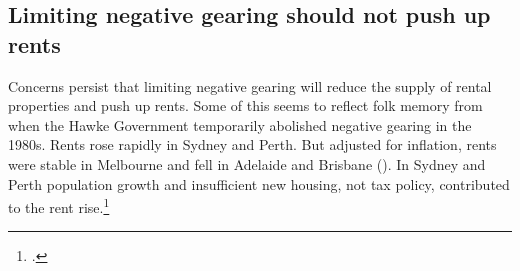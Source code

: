 \documentclass{grattan}\usepackage[]{graphicx}\usepackage[]{color}
\makeatletter
\newenvironment{kframe}{%
 \def\at@end@of@kframe{}%
 \ifinner\ifhmode%
  \def\at@end@of@kframe{\end{minipage}}%
  \begin{minipage}{\columnwidth}%
 \fi\fi%
 \def\FrameCommand##1{\hskip\@totalleftmargin \hskip-\fboxsep
 \colorbox{shadecolor}{##1}\hskip-\fboxsep
     \hskip-\linewidth \hskip-\@totalleftmargin \hskip\columnwidth}%
 \MakeFramed {\advance\hsize-\width
   \@totalleftmargin\z@ \linewidth\hsize
   \@setminipage}}%
 {\par\unskip\endMakeFramed%
 \at@end@of@kframe}
\newenvironment{knitrout}{}{} %
\newcommand\gao{Grattan analysis of}
\makeatother
\begin{document}
\begin{knitrout}
\color{fgcolor}\begin{kframe}


{\ttfamily\noindent\bfseries\color{errorcolor}{\#\# Error in rbind(benefits\_by\_taxable\_income\_before\_deductions, benefits\_by\_taxable\_income): object 'benefits\_by\_taxable\_income\_before\_deductions' not found}}\end{kframe}
\end{knitrout}
% 

\subsection{Limiting negative gearing should not push up rents}
Concerns persist that limiting negative gearing will reduce the supply of rental properties and push up rents. Some of this seems to reflect folk memory from when the Hawke Government temporarily abolished negative gearing in the 1980s. Rents rose rapidly in Sydney and Perth. But adjusted for inflation, rents were stable in Melbourne and fell in Adelaide and Brisbane (). In Sydney and Perth population growth and insufficient new housing, not tax policy, contributed to the rent rise.\footcite[pp.~47-48]{Daley2013}
\end{document}
